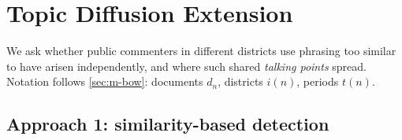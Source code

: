 
\section{Topic Diffusion Extension}\label{sec:diffusion}

We ask whether public commenters in different districts use phrasing too similar to have arisen
independently, and where such shared \emph{talking points} spread. Notation follows
\cref{sec:m-bow}: documents $d_n$, districts $i(n)$, periods $t(n)$.

\subsection{Approach 1: similarity-based detection}

